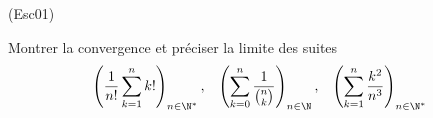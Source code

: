 \begin{tiny}(Esc01)\end{tiny} Montrer la convergence et préciser la limite des suites
\begin{displaymath}
\left( \frac{1}{n!}\sum_{k=1}^{n}k!\right)_{n\in \N^{*}} ,\hspace{0.3cm}
\left( \sum_{k=0}^{n}\frac{1}{\binom{n}{k}}\right)_{n\in \N} ,\hspace{0.3cm}
\left( \sum_{k=1}^{n}\frac{k^2}{n^3}\right)_{n\in \N^*} 
\end{displaymath}